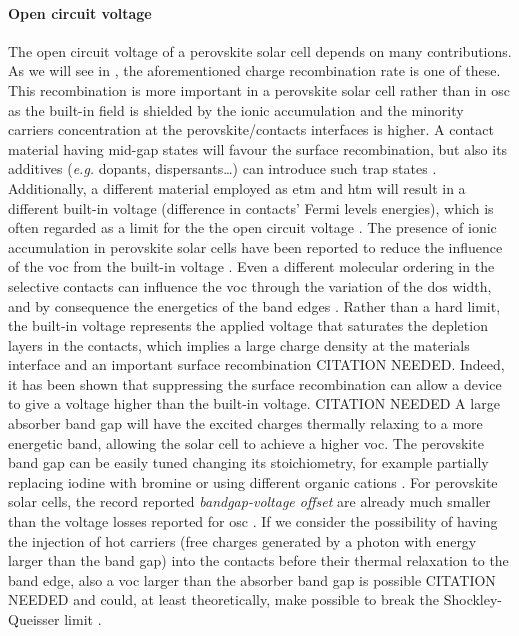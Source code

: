 	\paragraph{Open circuit voltage}
	The open circuit voltage of a perovskite solar cell depends on many contributions.
	As we will see in \cite{ch:characterization}, the aforementioned charge recombination rate is one of these.
	This recombination is more important in a perovskite solar cell rather than in \gls{osc} as the built-in field is shielded by the ionic accumulation and the minority carriers concentration at the perovskite\-/contacts interfaces is higher.
	A contact material having mid-gap states will favour the surface recombination, but also its additives (\textsl{e.g.} dopants, dispersants\dots) can introduce such trap states \cite{Correa-Baena2017}.
	Additionally, a different material employed as \gls{etm} and \gls{htm} will result in a different built-in voltage (difference in contacts' Fermi levels energies), which is often regarded as a limit for the the open circuit voltage \cite{Gelmetti2019,Wu2016}.
	The presence of ionic accumulation in perovskite solar cells have been reported to reduce the influence of the \gls{voc} from the built-in voltage \cite{Belisle2016}.
	Even a different molecular ordering in the selective contacts can influence the \gls{voc} through the variation of the \gls{dos} width, and by consequence the energetics of the band edges \cite{Shao2016}. 
	Rather than a hard limit, the built-in voltage represents the applied voltage that saturates the depletion layers in the contacts, which implies a large charge density at the materials interface and an important surface recombination CITATION NEEDED.
	Indeed, it has been shown that suppressing the surface recombination can allow a device to give a voltage higher than the built-in voltage. CITATION NEEDED
	A large absorber band gap will have the excited charges thermally relaxing to a more energetic band, allowing the solar cell to achieve a higher \gls{voc}.
	The perovskite band gap can be easily tuned changing its stoichiometry, for example partially replacing iodine with bromine \cite{McMeekin2016,Noh2013a,Wheeler2017} or using different organic cations \cite{Eperon2014}.
	For perovskite solar cells, the record reported \textit{bandgap\hyp{}voltage offset} are already much smaller than the voltage losses reported for \gls{osc} \cite{Tvingstedt2015}.
	If we consider the possibility of having the injection of hot carriers (free charges generated by a photon with energy larger than the band gap) into the contacts before their thermal relaxation to the band edge, also a \gls{voc} larger than the absorber band gap is possible CITATION NEEDED and could, at least theoretically, make possible to break the Shockley\hyp{}Queisser limit \cite{WikipediaSQlimit}.

